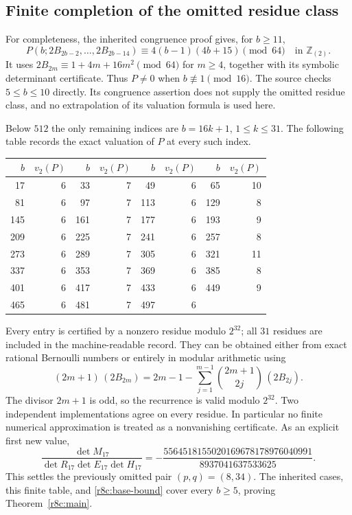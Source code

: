 \subsection{Finite completion of the omitted residue class}

For completeness, the inherited congruence proof gives, for $b\ge11$,
\[
 P(b;2B_{2b-2},\ldots,2B_{2b-14})
       \equiv4(b-1)(4b+15)\pmod {64}
       \quad\text{in }\mathbb Z_{(2)}.
\]
It uses $2B_{2m}\equiv1+4m+16m^2\pmod {64}$ for $m\ge4$,
together with its symbolic determinant certificate. Thus $P\ne0$
when $b\not\equiv1\pmod {16}$. The source checks $5\le b\le10$
directly. Its congruence assertion does not supply the omitted
residue class, and no extrapolation of its valuation formula is
used here.

Below $512$ the only remaining indices are $b=16k+1$,
$1\le k\le31$. The following table records the exact valuation
of $P$ at every such index.
\begin{center}
\begin{tabular}{r r@{\qquad}r r@{\qquad}r r@{\qquad}r r}
\hline
$b$&$v_2(P)$&$b$&$v_2(P)$&$b$&$v_2(P)$&$b$&$v_2(P)$\\
\hline
17&6&33&7&49&6&65&10\\
81&6&97&7&113&6&129&8\\
145&6&161&7&177&6&193&9\\
209&6&225&7&241&6&257&8\\
273&6&289&7&305&6&321&11\\
337&6&353&7&369&6&385&8\\
401&6&417&7&433&6&449&9\\
465&6&481&7&497&6&&\\
\hline
\end{tabular}
\end{center}
Every entry is certified by a nonzero residue modulo $2^{32}$;
all $31$ residues are included in the machine-readable record.
They can be obtained either from exact rational Bernoulli numbers
or entirely in modular arithmetic using
\[
 (2m+1)\,(2B_{2m})
 =2m-1-\sum_{j=1}^{m-1}\binom{2m+1}{2j}\,(2B_{2j}).
\]
The divisor $2m+1$ is odd, so the recurrence is valid modulo
$2^{32}$. Two independent implementations agree on every residue.
In particular no finite numerical approximation is treated as a
nonvanishing certificate. As an explicit first new value,
\[
 \frac{\det M_{17}}{\det R_{17}\det E_{17}\det H_{17}}
   =-\frac{5564518155020169678178976040991}{8937041637533625}.
\]
This settles the previously omitted pair $(p,q)=(8,34)$.
The inherited cases, this finite table, and
\eqref{r8c:base-bound} cover every $b\ge5$, proving
Theorem~\ref{r8c:main}.

